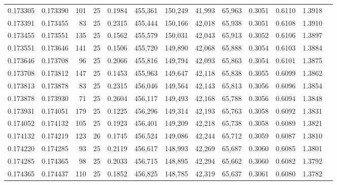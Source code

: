 \begin{tabular}{rrrrrrrrrrrrr}
0.173305 & 0.173390 &   101 &  25 &                                     0.1984 & 455,361 & 150,249 &  41,993 &  65,963 & 0.3051 & 0.6110 & 1.3918 \\
0.173391 & 0.173455 &    83 &  25 &                                     0.2315 & 455,444 & 150,166 &  42,018 &  65,938 & 0.3051 & 0.6108 & 1.3910 \\
0.173455 & 0.173551 &   135 &  25 &                                     0.1562 & 455,579 & 150,031 &  42,043 &  65,913 & 0.3052 & 0.6106 & 1.3897 \\
0.173551 & 0.173646 &   141 &  25 &                                     0.1506 & 455,720 & 149,890 &  42,068 &  65,888 & 0.3054 & 0.6103 & 1.3884 \\
0.173646 & 0.173708 &    96 &  25 &                                     0.2066 & 455,816 & 149,794 &  42,093 &  65,863 & 0.3054 & 0.6101 & 1.3875 \\
0.173708 & 0.173812 &   147 &  25 &                                     0.1453 & 455,963 & 149,647 &  42,118 &  65,838 & 0.3055 & 0.6099 & 1.3862 \\
0.173813 & 0.173878 &    83 &  25 &                                     0.2315 & 456,046 & 149,564 &  42,143 &  65,813 & 0.3056 & 0.6096 & 1.3854 \\
0.173878 & 0.173930 &    71 &  25 &                                     0.2604 & 456,117 & 149,493 &  42,168 &  65,788 & 0.3056 & 0.6094 & 1.3848 \\
0.173931 & 0.174051 &   179 &  25 &                                     0.1225 & 456,296 & 149,314 &  42,193 &  65,763 & 0.3058 & 0.6092 & 1.3831 \\
0.174052 & 0.174132 &   105 &  25 &                                     0.1923 & 456,401 & 149,209 &  42,218 &  65,738 & 0.3058 & 0.6089 & 1.3821 \\
0.174132 & 0.174219 &   123 &  26 &                                     0.1745 & 456,524 & 149,086 &  42,244 &  65,712 & 0.3059 & 0.6087 & 1.3810 \\
0.174220 & 0.174285 &    93 &  25 &                                     0.2119 & 456,617 & 148,993 &  42,269 &  65,687 & 0.3060 & 0.6085 & 1.3801 \\
0.174285 & 0.174365 &    98 &  25 &                                     0.2033 & 456,715 & 148,895 &  42,294 &  65,662 & 0.3060 & 0.6082 & 1.3792 \\
0.174365 & 0.174437 &   110 &  25 &                                     0.1852 & 456,825 & 148,785 &  42,319 &  65,637 & 0.3061 & 0.6080 & 1.3782 \\

\end{tabular}
